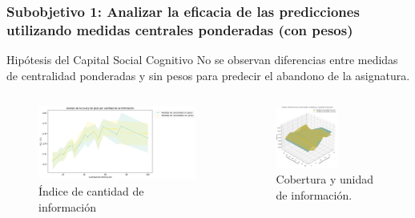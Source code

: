 \documentclass{beamer}
\begin{document}
\begin{frame}
	\frametitle{Subobjetivo 1: Analizar la eficacia de las predicciones utilizando medidas centrales ponderadas (con pesos)}
\begin{block}{Hipótesis del Capital Social Cognitivo}
	No se observan diferencias entre medidas de centralidad ponderadas y sin pesos para predecir el abandono de la asignatura.
\end{block}
		\begin{columns}[c]
	\begin{column}{.5\textwidth}
		\begin{figure}
			\centering
			\includegraphics[width=1\textwidth]{figs/cap7/figura_36}
\caption{Índice de cantidad de información}
		\end{figure}      
	\end{column}
	\begin{column}{.5\textwidth}
		\begin{figure}
			\centering
			\includegraphics[width=0.6\textwidth]{figs/cap7/figura_37}
			\caption{Cobertura y unidad de información.}
		\end{figure}
	\end{column}
\end{columns}

	
	
\end{frame}
\end{document}
